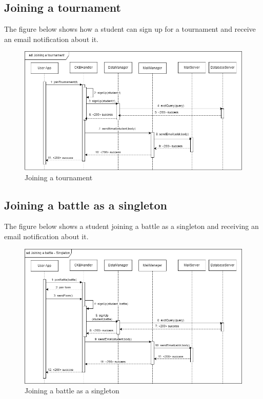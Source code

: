 \subsection{Joining a tournament}
The figure below shows how a student can sign up for a tournament and receive an email notification about it.\\
\begin{figure}[H]
    \centering
    \includegraphics[width=1\textwidth]{images/seq_diagrams/joining_tournament_DD.png}
    \caption{Joining a tournament}
\end{figure}
\clearpage

\subsection{Joining a battle as a singleton}
The figure below shows a student joining a battle as a singleton and receiving an email notification about it.\\
\begin{figure}[H]
    \centering
    \includegraphics[width=1\textwidth]{images/seq_diagrams/joining_battle_singleton_DD.png}
    \caption{Joining a battle as a singleton}
\end{figure}
\clearpage

